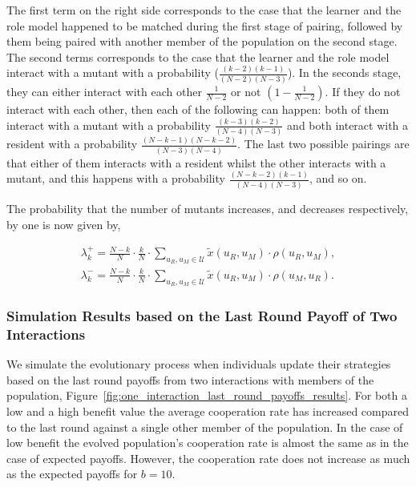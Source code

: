 \documentclass[11pt]{article}
\theoremstyle{plainCl1}
\theoremstyle{plainCl2}
\begin{document}
The first term on the right side corresponds to the case that the learner and
the role model happened to be matched during the first stage of pairing,
followed by them being paired with another member of the population on the
second stage. The second terms corresponds to the case that the learner and the
role model interact with a mutant with a probability ($\frac{\left(k - 2\right)
\left(k - 1\right)}{(N\!-\!2)(N\!-\!3)}$). In the seconds stage, they can either
interact with each other $\frac{1}{N - 2}$ or not $(1 - \frac{1}{N - 2})$. If
they do not interact with each other, then each of the following can happen:
both of them interact with a mutant with a probability
$\frac{(k-3)(k-2)}{(N-4)(N-3)}$ and both interact with a resident with a
probability $\frac{(N-k-1)(N-k-2)}{(N-3)(N-4)}$. The last two possible pairings
are that either of them interacts with a resident whilst the other interacts
with a mutant, and this happens with a probability
$\frac{(N-k-2)(k-1)}{(N-4)(N-3)}$, and so on.

The probability that the number of mutants increases, and decreases
respectively, by one is now given by,

\begin{align}\label{eq:ratio_limited}
\lambda^+_k=\frac{N\!-\!k}{N}\cdot \frac{k}{N}\cdot \sum_{u_{R},u_{M}\in\mathcal{U}} \tilde{x}(u_{R},u_{M})\cdot \rho(u_{R},u_{M}), \\
\lambda^-_k=\frac{N\!-\!k}{N}\cdot \frac{k}{N}\cdot \sum_{u_{R},u_{M}\in\mathcal{U}} \tilde{x}(u_{R},u_{M})\cdot \rho(u_{M},u_{R}).
\end{align}

\subsubsection*{Simulation Results based on the Last Round Payoff of Two Interactions}

We simulate the evolutionary process when individuals update their strategies
based on the last round payoffs from two interactions with members of the
population, Figure~\ref{fig:one_interaction_last_round_payoffs_results}. For
both a low and a high benefit value the average cooperation rate has increased
compared to the last round against a single other member of the population. In
the case of low benefit the evolved population's cooperation rate is almost the
same as in the case of expected payoffs. However, the cooperation rate does not
increase as much as the expected payoffs for \(b=10\).
\end{document}
